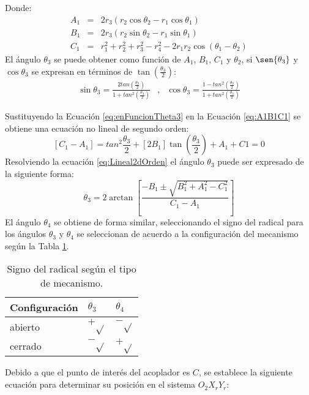 Donde:
\begin{eqnarray}
A_1&=& 2r_3(r_2\cos{\theta_2}-r_1\cos{\theta_1}) \label{eq:A1} \\
B_1&=& 2r_3(r_2\sin{\theta_2}-r_1\sin{\theta_1}) \label{eq:B1} \\
C_1&=& r_1^2+r_2^2+r_3^2-r_4^2 -2r_1r_2\cos(\theta_1-\theta_2) \label{eq:C1}
\end{eqnarray}
El ángulo $\theta_3$ se puede obtener como función de $A_1$, $B_1$, $C_1$ y $\theta_2$, si $\sen{\theta_3}$ y $\cos{\theta_3}$  se expresan en términos de $\tan(\frac{\theta_3}{2})$:
\begin{eqnarray}
\sin{\theta_3}= \frac{2tan(\frac{\theta_3}{2})}{1+tan^2(\frac{\theta_3}{2})}&,& \cos{\theta_3}= \frac{1-tan^2(\frac{\theta_3}{2})}{1+tan^2(\frac{\theta_3}{2})} \label{eq:enFuncionTheta3}
\end{eqnarray}

Sustituyendo la Ecuación \ref{eq:enFuncionTheta3} en la Ecuación \ref{eq:A1B1C1} se obtiene una ecuación no lineal de segundo orden:
\begin{equation} \label{eq:Lineal2dOrden}
 \left[C_1 -A_1\right]= tan^2{\frac{\theta_3}{2}}+\left[2B_1\right]\tan{(\frac{\theta_3}{2})}+A_1+C1=0
\end{equation}
Resolviendo la ecuación \ref{eq:Lineal2dOrden} el ángulo $\theta_3$ puede ser expresado de la siguiente forma:
\begin{equation} \label{eq:Lineal2dOrden_resuelta}
\theta_3= 2\arctan \left[ \frac{-B_1 \pm \sqrt{B^2_1+A^2_1-C^2_1}}{C_1-A_1} \right]
\end{equation}
El ángulo $\theta_4$ se obtiene de forma similar, seleccionando el signo del radical para los
ángulos $\theta_3$ y $\theta_4$ se seleccionan de acuerdo a la configuración del mecanismo según
la Tabla \ref{tab:Signo del radical}.
\begin{table}[]
\centering
\begin{tabular}{|l|l|l|}
\hline
\textbf{Configuración}& $\theta_3$& $\theta_4$  \\ \hline
abierto &  $+ \sqrt{}$&   $- \sqrt{}$  \\ \hline
cerrado & $- \sqrt{}$ & $ + \sqrt{}$  \\ \hline
\end{tabular}
\caption{Signo del radical según el tipo de mecanismo.}
\label{tab:Signo del radical}
\end{table}

Debido a que el punto de interés del acoplador es $C$, se establece la siguiente ecuación para determinar su posición en el sistema $O_2 X_r Y_r$:

